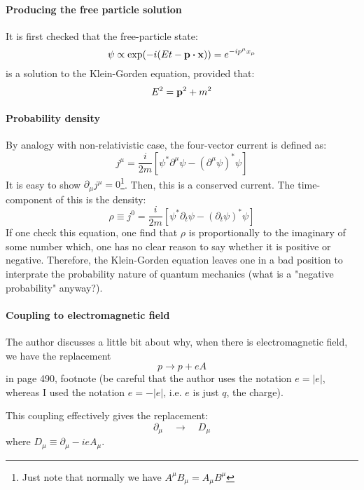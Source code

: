 \documentclass{article}
\begin{document}
\paragraph{Producing the free particle solution} It is first checked
that the free-particle state:
\begin{equation}
    \psi \propto \exp(-i(Et-\vb{p}\vdot\vb{x})) = e^{-ip^\mu x_\mu}
\end{equation}
is a solution to the Klein-Gorden equation, provided that:
\begin{equation}
    E^2 = \vb{p}^2+m^2
\end{equation}

\paragraph{Probability density} By analogy with non-relativistic case,
the four-vector current is defined as:
\begin{equation}
    j^\mu = \frac{i}{2m}
    [\psi^*\partial^\mu\psi - (\partial^\mu\psi)^*\psi]
\end{equation}
It is easy to show $\partial_\mu j^\mu=0$\footnote{Just note that
normally we have $A^\mu B_\mu = A_\mu B^\mu$}. Then, this is a
conserved current. The time-component of this is the density:
\begin{equation}
    \rho \equiv j^0 = \frac{i}{2m}
    \left[\psi^*\partial_t\psi - (\partial_t\psi)^*\psi\right]
\end{equation}
If one check this equation, one find that $\rho$ is proportionally to
the imaginary of some number which, one has no clear reason to say
whether it is positive or negative. Therefore, the Klein-Gorden
equation leaves one in a bad position to interprate the probability
nature of quantum mechanics (what is a "negative probability"
anyway?).

\paragraph{Coupling to electromagnetic field} The author discusses a
little bit about why, when there is electromagnetic field, we have the
replacement
\begin{equation}
    p\to p+eA
\end{equation}
in page 490, footnote (be careful that the author uses the notation
$e=|e|$, whereas I used the notation $e=-|e|$, i.e. $e$ is just $q$,
the charge).

This coupling effectively gives the replacement:
\begin{equation}
    \partial_\mu \quad\to\quad D_\mu
\end{equation}
where $D_\mu\equiv\partial_\mu - ieA_\mu$.
\end{document}
